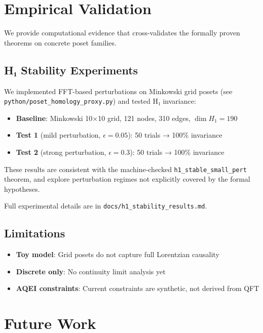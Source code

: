 \documentclass[12pt]{article}
\begin{document}
\section{Empirical Validation}

We provide computational evidence that cross-validates the formally proven theorems on concrete poset families.

\subsection{H₁ Stability Experiments}

We implemented FFT-based perturbations on Minkowski grid posets (see \texttt{python/poset\_homology\_proxy.py}) and tested H₁ invariance:

\begin{itemize}
    \item \textbf{Baseline}: Minkowski 10×10 grid, 121 nodes, 310 edges, $\dim H_1 = 190$
    \item \textbf{Test 1} (mild perturbation, $\epsilon=0.05$): 50 trials → 100\% invariance
    \item \textbf{Test 2} (strong perturbation, $\epsilon=0.3$): 50 trials → 100\% invariance
\end{itemize}

These results are consistent with the machine-checked \texttt{h1\_stable\_small\_pert} theorem, and explore perturbation regimes not explicitly covered by the formal hypotheses.

Full experimental details are in \texttt{docs/h1\_stability\_results.md}.

\subsection{Limitations}

\begin{itemize}
    \item \textbf{Toy model}: Grid posets do not capture full Lorentzian causality
    \item \textbf{Discrete only}: No continuity limit analysis yet
    \item \textbf{AQEI constraints}: Current constraints are synthetic, not derived from QFT
\end{itemize}

\section{Future Work}
\end{document}
